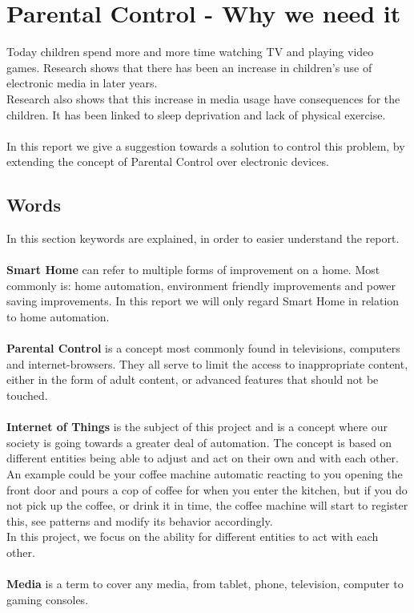 \chapter{Parental Control - Why we need it} 
Today children spend more and more time watching TV and playing video games. Research shows that there has been an increase in children's use of electronic media in later years. \citep{sundhedsstyrelsen}\\
Research also shows that this increase in media usage have consequences for the children. It has been linked to sleep deprivation\citep{bmcPublicHealth} and lack of physical exercise\citep{bmcPublicHealth}.\\
\\
In this report we give a suggestion towards a solution to control this problem, by extending  the concept of Parental Control over electronic devices.

\section{Words}
In this section keywords are explained, in order to easier understand the report.\\
\\
\textbf{Smart Home} can refer to multiple forms of improvement on a home. Most commonly is: home automation, environment friendly improvements and power saving improvements. In this report we will only regard Smart Home in relation to home automation.\\
\\
\textbf{Parental Control} is a concept most commonly found in televisions, computers and internet-browsers. They all serve to limit the access to inappropriate content, either in the form of adult content, or advanced features that should not be touched.\\
\\
\textbf{Internet of Things} is the subject of this project and is a concept where our society is going towards a greater deal of automation. The concept is based on different entities being able to adjust and act on their own and with each other. An example could be your coffee machine automatic reacting to you opening the front door and pours a cop of coffee for when you enter the kitchen, but if you do not pick up the coffee, or drink it in time, the coffee machine will start to register this, see patterns and modify its behavior accordingly.\citep{internetOfThings}\\
In this project, we focus on the ability for different entities to act with each other. \\
\\
\textbf{Media} is a term to cover any media, from tablet, phone, television, computer to gaming consoles.

